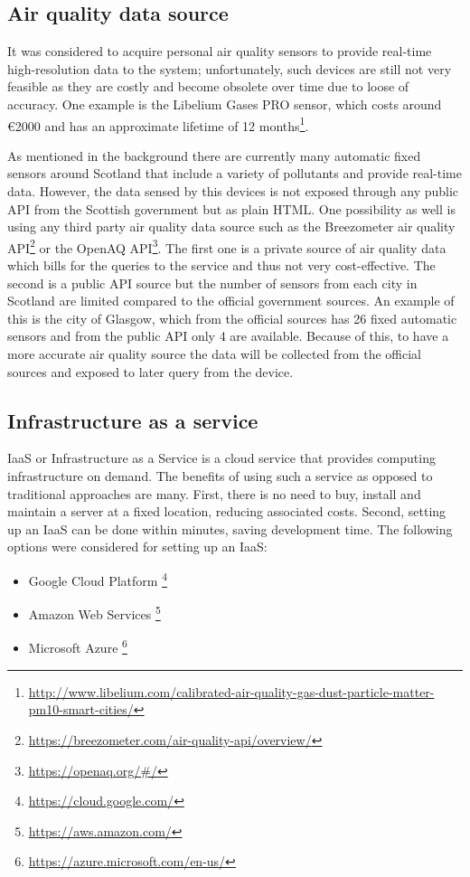 \subsection{Air quality data source}
It was considered to acquire personal air quality sensors to provide real-time high-resolution data to the system; unfortunately, such devices are still not very feasible as they are costly and become obsolete over time due to loose of accuracy. One example is the Libelium Gases PRO sensor, which costs around \euro{}2000 and has an approximate lifetime of 12 months\footnote{\url{http://www.libelium.com/calibrated-air-quality-gas-dust-particle-matter-pm10-smart-cities/}}. 

As mentioned in the background there are currently many automatic fixed sensors around Scotland that include a variety of pollutants and provide real-time data. However, the data sensed by this devices is not exposed through any public API from the Scottish government but as plain HTML. One possibility as well is using any third party air quality data source such as the Breezometer air quality API\footnote{\url{https://breezometer.com/air-quality-api/overview/}} or the OpenAQ API\footnote{\url{https://openaq.org/#/}}. The first one is a private source of air quality data which bills for the queries to the service and thus not very cost-effective. The second is a public API source but the number of sensors from each city in Scotland are limited compared to the official government sources. An example of this is the city of Glasgow, which from the official sources has 26 fixed automatic sensors and from the public API only 4 are available. Because of this, to have a more accurate air quality source the data will be collected from the official sources and exposed to later query from the device. 


\subsection{Infrastructure as a service}

IaaS or Infrastructure as a Service is a cloud service that provides computing infrastructure on demand. The benefits of using such a service as opposed to traditional approaches are many. First, there is no need to buy, install and maintain a server at a fixed location, reducing associated costs. Second, setting up an IaaS can be done within minutes, saving  development time. The following options were considered for setting up an IaaS: 

\begin{itemize}
	\item Google Cloud Platform \footnote{\url{https://cloud.google.com/}}
    \item Amazon Web Services \footnote{\url{https://aws.amazon.com/}}
    \item Microsoft Azure \footnote{\url{https://azure.microsoft.com/en-us/}}
\end{itemize}

